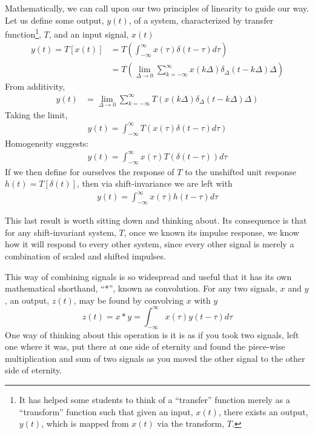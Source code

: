 \documentclass[11pt]{book}
\begin{document}
Mathematically, we can call upon our two principles of linearity to guide our way. Let us define some output, $y(t)$, of a system, characterized by transfer function\footnote{It has helped some students to think of a ``transfer'' function merely as a ``transform'' function such that given an input, $x(t)$, there exists an output, $y(t)$, which is mapped from $x(t)$ via the transform, $T$.}, $T$, and an input signal, $x(t)$
\begin{align}
	y(t) = T[x(t)] &= T\left(\int_{-\infty}^{\infty}x(\tau)\delta(t-\tau)d\tau\right) \\
	&= T\left(\lim_{\Delta\rightarrow 0}\sum_{k=-\infty}^{\infty}x(k\Delta)\delta_{\Delta}(t-k\Delta)\Delta\right)
\end{align}
From additivity,
\begin{align}
	y(t) &= \lim_{\Delta\rightarrow 0}\sum_{k=-\infty}^{\infty}T\left(x(k\Delta)\delta_{\Delta}(t-k\Delta)\Delta\right)
\end{align}
Taking the limit,
\begin{align}
	y(t) = \int_{-\infty}^{\infty}T(x(\tau)\delta(t-\tau)d\tau)
\end{align}
Homogeneity suggests:
\begin{align}
	y(t) = \int_{-\infty}^{\infty}x(\tau)T(\delta(t-\tau))d\tau
\end{align}
If we then define for ourselves the response of $T$ to the unshifted unit response $h(t) = T[\delta(t)]$, then via shift-invariance we are left with
\begin{align}
	y(t) = \int_{-\infty}^{\infty}x(\tau)h(t-\tau)d\tau
\end{align}

This last result is worth sitting down and thinking about. Its consequence is that for any shift-invariant system, $T$, once we known its impulse response, we know how it will respond to every other system, since every other signal is merely a combination of scaled and shifted impulses.

This way of combining signals is so widespread and useful that it has its own mathematical shorthand, ``$*$'', known as convolution. For any two signals, $x$ and $y$, an output, $z(t)$, may be found by convolving $x$ with $y$
\begin{equation}
	z(t) = x*y = \int_{-\infty}^{\infty}x(\tau)y(t-\tau)d\tau
\end{equation} 
One way of thinking about this operation is it is as if you took two signals, left one where it was, put there at one side of eternity and found the piece-wise multiplication and sum of two signals as you moved the other signal to the other side of eternity.
\end{document}
